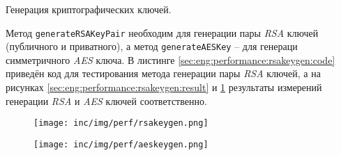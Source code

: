 \subsubsection{} Генерация криптографических ключей.
\label{sec:eng:performance:rsakeygen}

Метод \texttt{generateRSAKeyPair} необходим для генерации пары \textit{RSA} ключей (публичного и приватного), а метод \texttt{generateAESKey} -- для генераци симметричного \textit{AES} ключа. В листинге \ref{sec:eng:performance:rsakeygen:code} приведён код для тестирования метода генерации пары \textit{RSA} ключей, а на рисунках \ref{sec:eng:performance:rsakeygen:result} и \ref{sec:eng:performance:aeskeygen:result} результаты измерений генерации \textit{RSA} и \textit{AES} ключей соответственно.

\begin{code}
  
   \caption{Тестовый метод для метода генерации пары RSA ключей}
   \label{sec:eng:performance:rsakeygen:code}
\end{code}

\begin{figure}[h]
\centering
\begin{minipage}{.5\textwidth}
  \centering
  \texttt{[image: inc/img/perf/rsakeygen.png]}
  \label{sec:eng:performance:rsakeygen:result}
\end{minipage}%
\begin{minipage}{.5\textwidth}
  \centering
  \texttt{[image: inc/img/perf/aeskeygen.png]}
  \label{sec:eng:performance:aeskeygen:result}
\end{minipage}
\end{figure}



